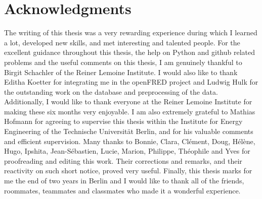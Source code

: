 \chapter*{Acknowledgments}
\label{chap:acknowledgments}

The writing of this thesis was a very rewarding experience during which I learned a lot, developed new skills, and met interesting and talented people.\newline
For the excellent guidance throughout this thesis, the help on Python and github related problems and the useful comments on this thesis, I am genuinely thankful to Birgit Schachler of the Reiner Lemoine Institute. I would also like to thank Editha Koetter for integrating me in the openFRED project and Ludwig Hulk for the outstanding work on the database and preprocessing of the data. Additionally, I would like to thank everyone at the Reiner Lemoine Institute for making these six months very enjoyable. \newline
I am also extremely grateful to Mathias Hofmann for agreeing to supervise this thesis within the Institute for Energy Engineering of the Technische Universität Berlin, and for his valuable comments and efficient supervision.\newline
Many thanks to Bonnie, Clara, Clément, Doug, Hélène, Hugo, Ipshita, Jean-Sébastien, Lucie, Marion, Philippe, Théophile and Yves for proofreading and editing this work. Their corrections and remarks, and their reactivity on such short notice, proved very useful.  
Finally, this thesis marks for me the end of two years in Berlin and I would like to thank all of the friends, roommates, teammates and classmates who made it a wonderful experience.